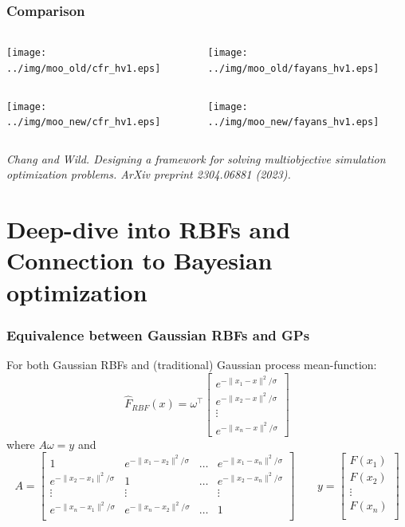 \documentclass[aspectratio=169]{beamer}
\begin{document}
\begin{frame}\frametitle{Comparison}
\begin{columns}
\begin{column}{0.5\textwidth}
\texttt{[image: ../img/moo\_old/cfr\_hv1.eps]}
\end{column}
\begin{column}{0.5\textwidth}
\texttt{[image: ../img/moo\_old/fayans\_hv1.eps]}
\end{column}
\end{columns}
\begin{columns}
\begin{column}{0.5\textwidth}
\texttt{[image: ../img/moo\_new/cfr\_hv1.eps]}
\end{column}
\begin{column}{0.5\textwidth}
\texttt{[image: ../img/moo\_new/fayans\_hv1.eps]}
\end{column}
\end{columns}

\vfill

{\tiny\it
Chang and Wild.
Designing a framework for solving multiobjective simulation optimization problems.
ArXiv preprint 2304.06881 (2023).
}
\end{frame}

\section{Deep-dive into RBFs and Connection to Bayesian optimization}

\begin{frame}\frametitle{Equivalence between Gaussian RBFs and GPs}
For both Gaussian RBFs and (traditional) Gaussian process mean-function:
$$
{\hat F}_{RBF}(x) =
\omega^\top \left[ \begin{array}{c}
e^{-\|x_1 - x\|^2/\sigma}\\
e^{-\|x_2 - x\|^2/\sigma}\\
\vdots\\
e^{-\|x_n - x\|^2/\sigma}
\end{array} \right]
$$
where
$ A \omega = y $
and 
$$
A = 
\left[
\begin{array}{cccc}
1 & e^{-\|x_1 - x_2\|^2/\sigma} & \ldots & e^{-\|x_1 - x_n\|^2/\sigma} \\
e^{-\|x_2 - x_1\|^2/\sigma} & 1 & \ldots & e^{-\|x_2 - x_n\|^2/\sigma} \\
\vdots & \vdots &  & \vdots \\
e^{-\|x_n - x_1\|^2/\sigma} & e^{-\|x_n - x_2\|^2/\sigma} & \ldots & 1 \\
\end{array}
\right]
\qquad
y = 
\left[
\begin{array}{c}
F(x_1) \\
F(x_2) \\
\vdots \\
F(x_n) \\
\end{array}
\right]
$$

\end{frame}
\end{document}
